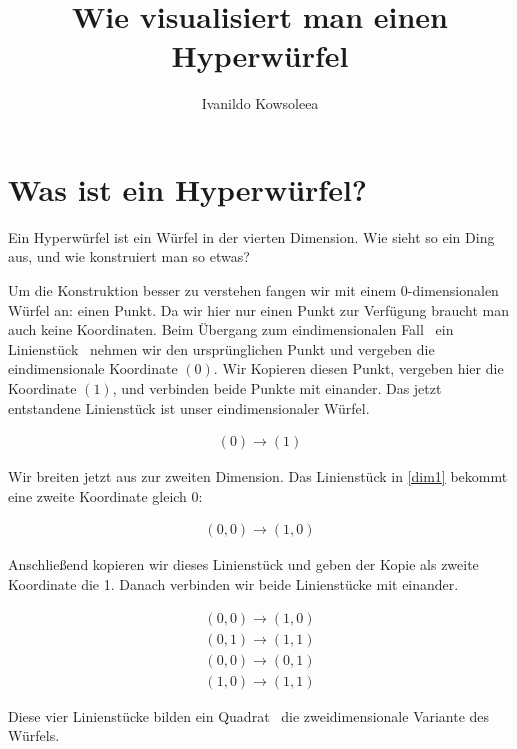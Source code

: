 \documentclass[10pt,a4paper,twoside,titlepage]{article}
\author{Ivanildo Kowsoleea}
\title{Wie visualisiert man einen Hyperwürfel}
\newcommand{\myeq}[2]{
	\begin{equation}
		\begin{split}
			#1
		\end{split}
		\label{#2}
	\end{equation}
}
\begin{document}
\maketitle
\leading{13pt}

\section{Was ist ein Hyperwürfel?}
Ein Hyperwürfel ist ein Würfel in der vierten Dimension. Wie sieht so
ein Ding aus, und wie konstruiert man so etwas?

Um die Konstruktion besser zu verstehen fangen wir mit einem 0-dimensionalen
Würfel an: einen Punkt. Da wir hier nur einen Punkt zur Verfügung 
braucht man auch keine Koordinaten. Beim Übergang zum eindimensionalen Fall 
\textemdash\ ein Linienstück \textemdash\ nehmen wir den ursprünglichen Punkt
und vergeben die eindimensionale Koordinate $(0)$. Wir Kopieren diesen Punkt,
vergeben hier die Koordinate $(1)$, und verbinden beide Punkte mit einander.
Das jetzt entstandene Linienstück ist unser eindimensionaler Würfel.

\myeq{(0)\rightarrow (1)}{dim1}

Wir breiten jetzt aus zur zweiten Dimension. Das Linienstück in \autoref{dim1}
bekommt eine zweite Koordinate gleich 0:
\myeq{(0,0)\rightarrow (1,0)}{dim1in2}
Anschließend kopieren wir dieses Linienstück und geben der Kopie als zweite
Koordinate die 1. Danach verbinden wir beide Linienstücke mit einander.

\myeq{(0,0)\rightarrow (1,0)\\
	(0,1)\rightarrow(1,1)\\
	(0,0)\rightarrow(0,1)\\
	(1,0)\rightarrow(1,1)}{dim2}
	
Diese vier Linienstücke bilden ein Quadrat \textemdash\ die zweidimensionale
Variante des Würfels.
\end{document}
